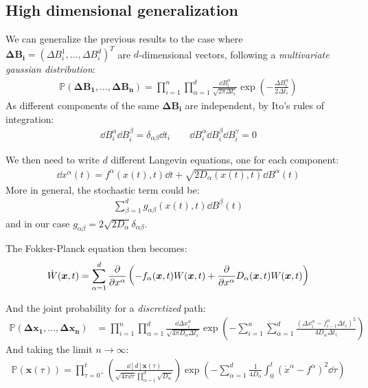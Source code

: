 \documentclass[../template.tex]{subfiles}
\begin{document}
\subsection{High dimensional generalization}
We can generalize the previous results to the case where $\bm{\Delta B_i} = (\Delta B_i^1, \dots, \Delta B_i^d)^T$ are $d$-dimensional vectors, following a \textit{multivariate gaussian distribution}:
\begin{align*}
    \mathbb{P}(\bm{\Delta B_1}, \dots, \bm{\Delta B_n}) = \prod_{i=1}^n \prod_{\alpha =1}^d \frac{\dd{B_i^\alpha}}{\sqrt{2 \pi \Delta t_i}} \exp\left(-\frac{\Delta B_i^\alpha}{2 \Delta t_i} \right) 
\end{align*}  
As different components of the same $\bm{\Delta B_i}$ are independent, by Ito's rules of integration:
\begin{align*}
    \dd{B_i^\alpha} \dd{B_i^\beta} = \delta_{\alpha \beta} \dd{t_i} \qquad \dd{B_i^\alpha} \dd{B_i^\beta} \dd{B_i^\gamma} = 0
\end{align*}

We then need to write $d$ different Langevin equations, one for each component:
\begin{align*}
    \dd{x^\alpha(t)} = f^\alpha(x(t),t) \dd{t} + \sqrt{2 D_\alpha (x(t),t)} \dd{B^\alpha(t)}
\end{align*}
More in general, the stochastic term could be:
\begin{align*}
    \sum_{\beta = 1}^d g_{\alpha \beta} (x(t),t) \dd{B^\beta(t)}
\end{align*}
and in our case $g_{\alpha \beta} = 2 \sqrt{2 D_\alpha} \delta_{\alpha \beta}$.

\medskip


The Fokker-Planck equation then becomes:
\begin{align*}
\dot{W}(\bm{x},t) = \sum_{\alpha=1}^d \pdv{x^\alpha} \left(-f_\alpha (\bm{x},t) W(\bm{x},t) + \pdv{x^\alpha} D_\alpha(\bm{x},t) W(\bm{x},t)\right)    
\end{align*}

And the joint probability for a \textit{discretized}  path:
\begin{align*}
    \mathbb{P}(\bm{\Delta x_1}, \dots, \bm{\Delta x_n}) &= \prod_{i=1}^n \prod_{\alpha =1}^d \frac{\dd{\Delta x_i^\alpha}}{\sqrt{4 \pi D_\alpha \Delta t_i}} \exp\left(-\sum_{i=1}^n \sum_{\alpha =1}^d \frac{(\Delta x_i^\alpha - f_{i-1}^\alpha \Delta t_i)^2}{4 D_\alpha \Delta t_i} \right)
\end{align*}
And taking the limit $n \to \infty$:
\begin{align*}
    \mathbb{P}(\bm{x}(\tau)) = \prod_{\tau=0^+}^t \left(\frac{\dd[d]{\bm{x}(\tau)}}{\sqrt{4 \pi\dd{\tau}} \prod_{\alpha=1}^d \sqrt{D_\alpha}}\right) \exp\left( - \sum_{\alpha=1}^d \frac{1}{4 D_\alpha} \int_0^t (\dot{x}^\alpha - f^\alpha)^2 \dd{\tau}\right)
\end{align*}
\end{document}
